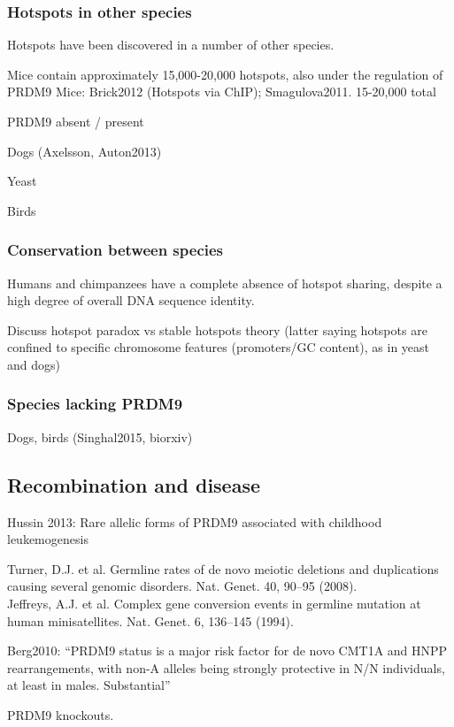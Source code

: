 \subsubsection{Hotspots in other species}

Hotspots have been discovered in a number of other species.

Mice contain approximately 15,000-20,000 hotspots, also under the regulation of PRDM9
Mice: Brick2012 (Hotspots via ChIP); Smagulova2011. 15-20,000 total

PRDM9 absent / present

Dogs (Axelsson, Auton2013)

Yeast

Birds


\subsubsection{Conservation between species}
Humans and chimpanzees have a complete absence of hotspot sharing, despite a high degree of overall DNA sequence identity\cite{Ptak2005,Winckler2005,Auton2012a}.

Discuss hotspot paradox vs stable hotspots theory (latter saying hotspots are confined to specific chromosome features (promoters/GC content), as in yeast and dogs)
\subsubsection{Species lacking PRDM9}
Dogs, birds (Singhal2015, biorxiv) 

\subsection{Recombination and disease}

Hussin 2013: Rare allelic forms of PRDM9 associated with childhood leukemogenesis

Turner, D.J. et al. Germline rates of de novo meiotic deletions and duplications causing several genomic disorders. Nat. Genet. 40, 90–95 (2008). \\
Jeffreys, A.J. et al. Complex gene conversion events in germline mutation at human minisatellites. Nat. Genet. 6, 136–145 (1994).

Berg2010:
``PRDM9 status is a major risk factor for de novo CMT1A and HNPP rearrangements, with non-A alleles being strongly protective in N/N individuals, at least in males. Substantial''

PRDM9 knockouts.

